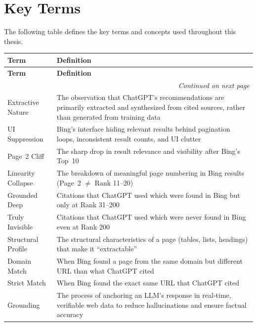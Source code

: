 \chapter{Key Terms}
\label{app:key-terms}

The following table defines the key terms and concepts used throughout this thesis.

\begin{longtable}{@{}lp{10cm}@{}}
\toprule
\textbf{Term} & \textbf{Definition} \\
\midrule
\endfirsthead

\toprule
\textbf{Term} & \textbf{Definition} \\
\midrule
\endhead

\midrule
\multicolumn{2}{r}{\emph{Continued on next page}} \\
\bottomrule
\endfoot

\bottomrule
\endlastfoot

Extractive Nature & The observation that ChatGPT's recommendations are primarily extracted and synthesized from cited sources, rather than generated from training data \\
UI Suppression & Bing's interface hiding relevant results behind pagination loops, inconsistent result counts, and UI clutter \\
Page~2 Cliff & The sharp drop in result relevance and visibility after Bing's Top~10 \\
Linearity Collapse & The breakdown of meaningful page numbering in Bing results (Page~2 $\neq$ Rank 11--20) \\
Grounded Deep & Citations that ChatGPT used which were found in Bing but only at Rank 31--200 \\
Truly Invisible & Citations that ChatGPT used which were never found in Bing even at Rank 200 \\
Structural Profile & The structural characteristics of a page (tables, lists, headings) that make it ``extractable'' \\
Domain Match & When Bing found a page from the same domain but different URL than what ChatGPT cited \\
Strict Match & When Bing found the exact same URL that ChatGPT cited \\
Grounding & The process of anchoring an LLM's response in real-time, verifiable web data to reduce hallucinations and ensure factual accuracy \\

\end{longtable}
